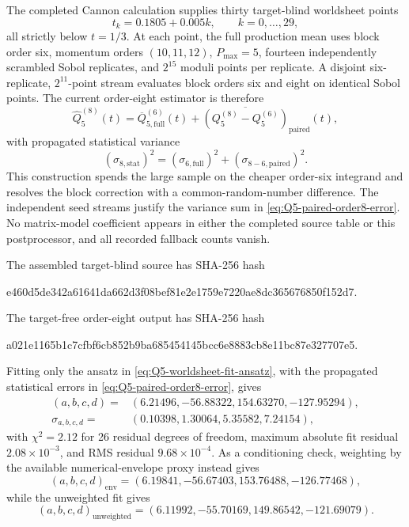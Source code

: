 \documentclass[11pt]{article}
\begin{document}
The completed Cannon calculation supplies thirty target-blind worldsheet
points
\begin{equation}
  t_k=0.1805+0.005k,
  \qquad k=0,\ldots,29,
  \label{eq:Q5-order8-grid}
\end{equation}
all strictly below $t=1/3$.  At each point, the full production mean uses
block order six, momentum orders $(10,11,12)$, $P_{\max}=5$, fourteen
independently scrambled Sobol replicates, and $2^{15}$ moduli points per
replicate.  A disjoint six-replicate, $2^{11}$-point stream evaluates block
orders six and eight on identical Sobol points.  The current order-eight
estimator is therefore
\begin{equation}
  \widehat Q_5^{(8)}(t)
  =\overline Q_{5,\mathrm{full}}^{(6)}(t)
   +\overline{\left(Q_5^{(8)}-Q_5^{(6)}\right)}_{\mathrm{paired}}(t),
  \label{eq:Q5-paired-order8-estimator}
\end{equation}
with propagated statistical variance
\begin{equation}
  \left(\sigma_{8,\mathrm{stat}}\right)^2
  =\left(\sigma_{6,\mathrm{full}}\right)^2
   +\left(\sigma_{8-6,\mathrm{paired}}\right)^2.
  \label{eq:Q5-paired-order8-error}
\end{equation}
This construction spends the large sample on the cheaper order-six
integrand and resolves the block correction with a common-random-number
difference.  The independent seed streams justify the variance sum in
\eqref{eq:Q5-paired-order8-error}.  No matrix-model coefficient appears in
either the completed source table or this postprocessor, and all recorded
fallback counts vanish.

The assembled target-blind source has SHA-256 hash
\begin{center}
\small\ttfamily
e460d5de342a61641da662d3f08bef81e2e1759e7220ae8dc365676850f152d7.
\end{center}
The target-free order-eight output has SHA-256 hash
\begin{center}
\small\ttfamily
a021e1165b1c7cfbf6cb852b9ba685454145bcc6e8883cb8e11bc87e327707e5.
\end{center}
Fitting only the ansatz in \eqref{eq:Q5-worldsheet-fit-ansatz}, with the
propagated statistical errors in \eqref{eq:Q5-paired-order8-error}, gives
\begin{equation}
\begin{split}
 (a,b,c,d)={}&(6.21496,-56.88322,154.63270,-127.95294),\\
 \sigma_{a,b,c,d}={}&(0.10398,1.30064,5.35582,7.24154),
\end{split}
\label{eq:Q5-order8-cubic-fit}
\end{equation}
with $\chi^2=2.12$ for 26 residual degrees of freedom, maximum absolute fit
residual $2.08\times10^{-3}$, and RMS residual $9.68\times10^{-4}$.  As a
conditioning check, weighting by the available numerical-envelope proxy
instead gives
\begin{equation}
 (a,b,c,d)_{\mathrm{env}}
 =(6.19841,-56.67403,153.76488,-126.77468),
\end{equation}
while the unweighted fit gives
\begin{equation}
 (a,b,c,d)_{\mathrm{unweighted}}
 =(6.11992,-55.70169,149.86542,-121.69079).
\end{equation}
\end{document}
